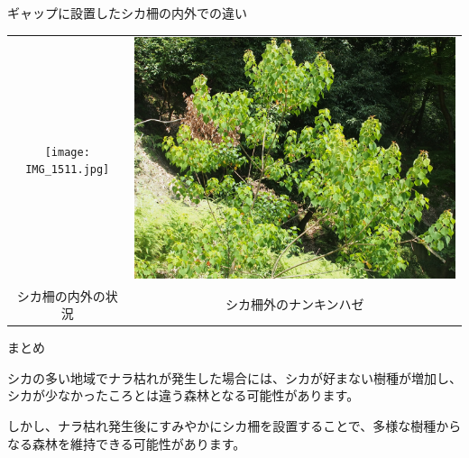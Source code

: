 \documentclass[unicode]{beamer}
\begin{document}
\begin{frame}
\begin{columns}[t]
\begin{column}{.49\linewidth}
\begin{block}{ギャップに設置したシカ柵の内外での違い}
{\centering
\vspace{3cm}
\begin{tabular}{cc}
\texttt{[image: IMG\_1511.jpg]} &
\includegraphics[width=20cm]{photo-4.jpg} \\
{\small シカ柵の内外の状況} &
{\small シカ柵外のナンキンハゼ}
\end{tabular}
}
\end{block}

\begin{block}{まとめ}

シカの多い地域でナラ枯れが発生した場合には、シカが好まない樹種が増加し、シカが少なかったころとは違う森林となる可能性があります。

\vspace{0.5cm}

しかし、ナラ枯れ発生後にすみやかにシカ柵を設置することで、多様な樹種からなる森林を維持できる可能性があります。


\end{block}

\end{column}
\end{columns}
\end{frame}
\end{document}

